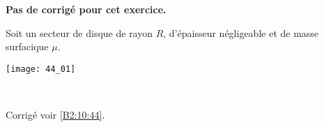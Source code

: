 \normaltrue \difficilefalse \tdifficilefalse
\correctionfalse


\setcounter{question}{0}
\ifcorrection
\else
\textbf{Pas de corrigé pour cet exercice.}
\fi




\ifprof
\else
Soit un secteur de disque de rayon $R$, d'épaisseur négligeable et de masse surfacique $\mu$. 
\begin{marginfigure}
\centering
\texttt{[image: 44\_01]}
\end{marginfigure}
\fi


\ifprof
\else
\fi

\ifprof ~\\
\else
\fi


\ifprof
\else
\begin{flushright}
\footnotesize{Corrigé voir \ref{B2:10:44}.}
\end{flushright}%
\fi